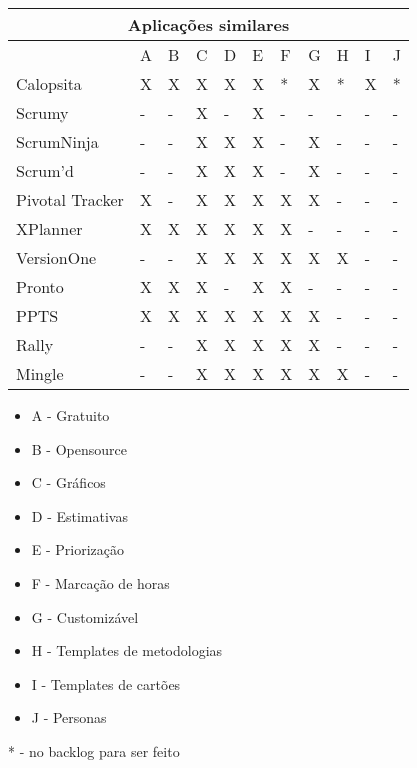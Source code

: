 \begin{tabular}{|l|l|l|l|l|l|l|l|l|l|l|}
	\hline
	\multicolumn{11}{|c|}{Aplicações similares} \\
	\hline
	                & A & B & C & D & E & F & G & H & I & J \\
	Calopsita       & X & X & X & X & X & * & X & * & X & * \\
	Scrumy          & - & - & X & - & X & - & - & - & - & - \\
	ScrumNinja      & - & - & X & X & X & - & X & - & - & - \\
	Scrum'd         & - & - & X & X & X & - & X & - & - & - \\
	Pivotal Tracker & X & - & X & X & X & X & X & - & - & - \\
	XPlanner        & X & X & X & X & X & X & - & - & - & - \\
	VersionOne      & - & - & X & X & X & X & X & X & - & - \\
	Pronto          & X & X & X & - & X & X & - & - & - & - \\
	PPTS            & X & X & X & X & X & X & X & - & - & - \\
	Rally           & - & - & X & X & X & X & X & - & - & - \\
	Mingle          & - & - & X & X & X & X & X & X & - & - \\
	\hline
\end{tabular}

\begin{itemize}
	\item A - Gratuito
	\item B - Opensource
	\item C - Gráficos
	\item D - Estimativas
	\item E - Priorização
	\item F - Marcação de horas
	\item G - Customizável
	\item H - Templates de metodologias
	\item I - Templates de cartões
	\item J - Personas
\end{itemize}

* - no backlog para ser feito

